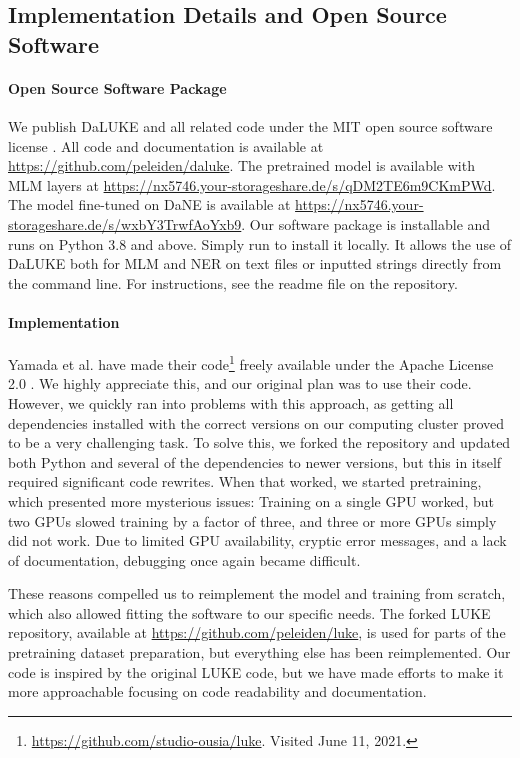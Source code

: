 \documentclass[main.tex]{subfiles}
\begin{document}
\subsection{Implementation Details and Open Source Software}%
\label{sub:oss}

\paragraph{Open Source Software Package}
We publish DaLUKE and all related code under the MIT open source software license \cite{mitlicense}.
All code and documentation is available at \url{https://github.com/peleiden/daluke}.
The pretrained model is available with MLM layers at \url{https://nx5746.your-storageshare.de/s/qDM2TE6m9CKmPWd}.
The model fine-tuned on DaNE is available at \url{https://nx5746.your-storageshare.de/s/wxbY3TrwfAoYxb9}.
Our software package is  installable and runs on Python 3.8 and above.
Simply run  to install it locally.
It allows the use of DaLUKE both for MLM and NER on text files or inputted strings directly from the command line.
For instructions, see the readme file on the repository.

\paragraph{Implementation}
Yamada et al. have made their code\footnote{\url{https://github.com/studio-ousia/luke}. Visited June 11, 2021.} freely available under the Apache License 2.0 \cite{apachelicense}.
We highly appreciate this, and our original plan was to use their code.
However, we quickly ran into problems with this approach, as getting all dependencies installed with the correct versions on our computing cluster proved to be a very challenging task.
To solve this, we forked the repository and updated both Python and several of the dependencies to newer versions, but this in itself required significant code rewrites.
When that worked, we started pretraining, which presented more mysterious issues:
Training on a single GPU worked, but two GPUs slowed training by a factor of three, and three or more GPUs simply did not work.
Due to limited GPU availability, cryptic error messages, and a lack of documentation, debugging once again became difficult.

These reasons compelled us to reimplement the model and training from scratch,  which also allowed fitting the software to our specific needs.
The forked LUKE repository, available at \url{https://github.com/peleiden/luke}, is used for parts of the pretraining dataset preparation, but everything else has been reimplemented.
Our code is inspired by the original LUKE code, but we have made efforts to make it more approachable focusing on code readability and documentation.
\end{document}

